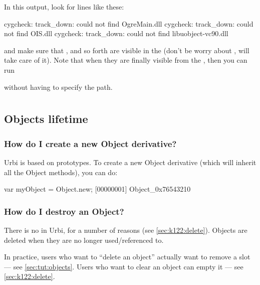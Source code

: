 In this output, look for lines like these:

\begin{shell}
cygcheck: track_down: could not find OgreMain.dll
cygcheck: track_down: could not find OIS.dll
cygcheck: track_down: could not find libuobject-vc90.dll
\end{shell}

\noindent
and make sure that ,  and so forth are
visible in the  (don't be worry about ,
 will take care of it).  Note that when they are
finally visible from the , then you can run


\noindent
without having to specify the path.

\section{\us}
\subsection{Objects lifetime}

\subsubsection{How do I create a new Object derivative?}
Urbi is based on prototypes. To create a new Object derivative (which
will inherit all the Object methods), you can do:

\begin{urbiscript}
var myObject = Object.new;
[00000001] Object_0x76543210
\end{urbiscript}

\subsubsection{How do I destroy an Object?}
There is no  in Urbi, for a number of reasons (see
\autoref{sec:k122:delete}).  Objects are deleted when they are no
longer used/referenced to.

In practice, users who want to ``delete an object'' actually want to
remove a slot --- see \autoref{sec:tut:objects}.  Users who want to
clear an object can empty it --- see \autoref{sec:k122:delete}.

